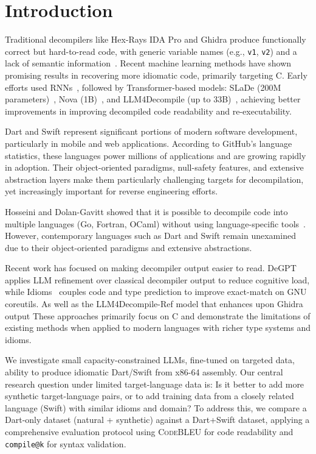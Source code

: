 \documentclass[10pt,conference]{IEEEtran}
\makeatletter
\newcommand{\codebleu}{\textsc{CodeBLEU}\xspace}
\newcommand{\compileatk}{\texttt{compile@k}\xspace}
\makeatother
\begin{document}
\section{Introduction}
Traditional decompilers like Hex-Rays IDA Pro and Ghidra produce functionally correct but hard-to-read code, with generic variable names (e.g., \texttt{v1}, \texttt{v2}) and a lack of semantic information~\cite{dire2019}. Recent machine learning methods have shown promising results in recovering more idiomatic code, primarily targeting C. Early efforts used RNNs~\cite{katz2018}, followed by Transformer-based models: SLaDe (200M parameters)~\cite{slade2024}, Nova (1B)~\cite{nova2023}, and LLM4Decompile (up to 33B)~\cite{llm4decompile2024}, achieving better improvements in improving decompiled code readability and re-executability.

Dart and Swift represent significant portions of modern software development, particularly in mobile and web applications. According to GitHub's language statistics, these languages power millions of applications and are growing rapidly in adoption. Their object-oriented paradigms, null-safety features, and extensive abstraction layers make them particularly challenging targets for decompilation, yet increasingly important for reverse engineering efforts.

Hosseini and Dolan-Gavitt showed that it is possible to decompile code into multiple languages (Go, Fortran, OCaml) without using language-specific tools~\cite{hosseini2022}. However, contemporary languages such as Dart and Swift remain unexamined due to their object-oriented paradigms and extensive abstractions.

Recent work has focused on making decompiler output easier to read. DeGPT~\cite{degpt2024} applies LLM refinement over classical decompiler output to reduce cognitive load, while Idioms~\cite{idioms2025} couples code and type prediction to improve exact-match on GNU coreutils. As well as the LLM4Decompile-Ref model that enhances upon Ghidra output These approaches primarily focus on C and demonstrate the limitations of existing methods when applied to modern languages with richer type systems and idioms.

We investigate small capacity-constrained LLMs, fine-tuned on targeted data, ability to produce idiomatic Dart/Swift from x86-64 assembly. Our central research question under limited target-language data is: Is it better to add more synthetic target-language pairs, or to add training data from a closely related language (Swift) with similar idioms and domain? To address this, we compare a Dart-only dataset (natural + synthetic) against a Dart+Swift dataset, applying a comprehensive evaluation protocol using \codebleu{} for code readability and \compileatk{} for syntax validation.
\end{document}

